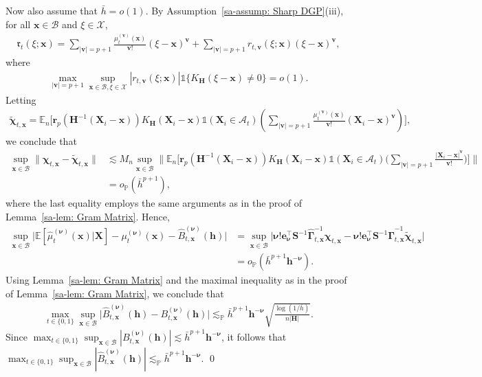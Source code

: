 \documentclass[10pt]{article}
\renewcommand{\P}{\mathbb{P}}
\newcommand{\E}{\mathbb{E}}
\newcommand{\Indicator}{\mathds{1}}
\newcommand{\En}{\mathbb{E}_n}
\newcommand{\lessp}{\lesssim_{\mathbb{P}}}
\newcommand{\fr}{\mathfrak{r}}
\newcommand{\be}{\mathbf{e}}
\newcommand{\bh}{\mathbf{h}}
\newcommand{\bH}{\mathbf{H}}
\newcommand{\br}{\mathbf{r}}
\newcommand{\bS}{\mathbf{S}}
\newcommand{\bv}{\mathbf{v}}
\newcommand{\bx}{\mathbf{x}}
\newcommand{\bX}{\mathbf{X}}
\newcommand{\bnu}{\boldsymbol{\nu}}
\newcommand{\bGamma}{\boldsymbol{\Gamma}}
\newcommand{\A}{\mathcal{A}}
\newcommand{\B}{\mathcal{B}}
\newcommand{\X}{\mathcal{X}}
\begin{document}
Now also assume that $\bar{h} = o(1)$. By Assumption~\ref{sa-assump: Sharp DGP}(iii), for all $\bx \in \B$ and $\xi \in \X$,
\begin{align*}
    \fr_t(\xi;\bx)
    = \sum_{|\bv|=p+1}\frac{\mu_t^{(\bv)}(\bx)}{\bv!}(\xi-\bx)^{\bv}
      + \sum_{|\bv|=p+1} r_{t,\bv}(\xi;\bx)(\xi-\bx)^{\bv},
\end{align*}
where
\begin{align*}
    \max_{|\bv|=p+1}\sup_{\bx\in\B,\xi\in\X}
    |r_{t,\bv}(\xi;\bx)|\Indicator\{K_{\bH}(\xi-\bx)\neq0\}=o(1).
\end{align*}
Letting
\begin{align*}
    \widetilde{\boldsymbol{\chi}}_{t,\bx}
    = \En \Big[\br_p(\bH^{-1}(\bX_i-\bx)) K_{\bH}(\bX_i - \bx)\Indicator(\bX_i \in \A_t) ( \sum_{|\bv| = p+1} \frac{\mu_t^{(\bv)}(\bx)}{\bv!}(\bX_i - \bx)^{\bv})\Big],
\end{align*}
we conclude that
\begin{align*}
   \sup_{\bx \in \B} \big\| \boldsymbol{\chi}_{t,\bx} - \widetilde{\boldsymbol{\chi}}_{t,\bx} \big\|
   &\lesssim M_n \sup_{\bx \in \B} \Big\| \En \Big[\br_p(\bH^{-1}(\bX_i-\bx)) K_{\bH}(\bX_i - \bx) \Indicator(\bX_i \in \A_t) \Big(\sum_{|\bv| = p+1} \frac{\left|\bX_i - \bx\right|^{\bv}}{\bv!} \Big) \Big] \Big\|\\
   &= o_{\P}(\bar{h}^{p+1}),
\end{align*}
where the last equality employs the same arguments as in the proof of Lemma~\ref{sa-lem: Gram Matrix}. Hence,
\begin{align*}
    \sup_{\bx \in \B} \Big|\E[\widehat{\mu}_t^{(\bnu)}(\bx)|\bX] - \mu_t^{(\bnu)}(\bx) - \widehat{B}_{t,\bx}^{(\bnu)}(\bh)\Big|
    &= \sup_{\bx \in \B} \Big|\bnu!\be_{\bnu}^{\top} \bS^{-1} \widehat{\bGamma}_{t,\bx}^{-1} \boldsymbol{\chi}_{t,\bx} - \bnu!\be_{\bnu}^{\top} \bS^{-1} \widehat{\bGamma}_{t,\bx}^{-1} \widetilde{\boldsymbol{\chi}}_{t,\bx}\Big|\\
    &= o_{\P}(\bar{h}^{p+1}\bh^{-\bnu}).
\end{align*}
Using Lemma~\ref{sa-lem: Gram Matrix} and the maximal inequality as in the proof of Lemma~\ref{sa-lem: Gram Matrix}, we conclude that
\begin{align*}
    \max_{t \in \{0,1\}} \sup_{\bx \in \B} \big|\widehat{B}_{t,\bx}^{(\bnu)}(\bh) - B_{t,\bx}^{(\bnu)}(\bh)\big|
    \lesssim_{\P} \bar{h}^{p+1}\bh^{-\bnu}\sqrt{\frac{\log(1/\bar{h})}{n |\bH|}}.
\end{align*}
Since $\max_{t \in \{0,1\}}\sup_{\bx \in \B}|B_{t,\bx}^{(\bnu)}(\bh)| \lesssim \bar{h}^{p+1}\bh^{-\bnu}$, it follows that $\max_{t \in \{0,1\}} \sup_{\bx \in \B}|\widehat{B}_{t,\bx}^{(\bnu)}(\bh)| \lessp \bar{h}^{p+1}\bh^{-\bnu}$.
\qed
\end{document}
